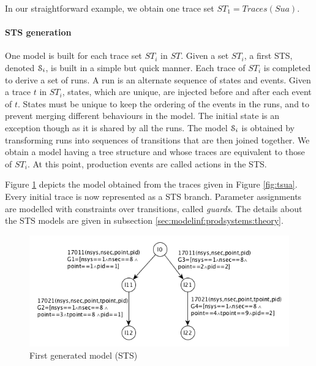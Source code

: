 In our straightforward example, we obtain one trace set
$ST_1=Traces(Sua)$.

\paragraph{STS generation}

One model is built for each trace set $ST_i$ in $ST$. Given a set
$ST_i$, a first STS, denoted $\EuScript{S}_i$, is built in a
simple but quick manner. Each trace of $ST_i$ is completed to
derive a set of runs. A run is an alternate sequence of states
and events. Given a trace $t$ in $ST_i$, states, which are
unique, are injected before and after each event of $t$. States
must be unique to keep the ordering of the events in the runs,
and to prevent merging different behaviours in the model.
The initial state is an exception though as it is shared by all
the runs. The model $\EuScript{S}_i$ is obtained by transforming
runs into sequences of transitions that are then joined together.
We obtain a model having a tree structure and whose traces are
equivalent to those of $ST_i$. At this point, production events
are called actions in the STS.

Figure \ref{fig:firstmodel} depicts the model obtained from the
traces given in Figure \ref{fig:tsua}. Every initial trace is now
represented as a STS branch. Parameter assignments are modelled
with constraints over transitions, called \textit{guards}. The
details about the STS models are given in subsection
\ref{sec:modelinf:prodsystems:theory}.\\

\begin{figure}[H]
	\begin{center}
        \includegraphics[width=1.0\linewidth]{figures/STS1.png}
	\end{center}

	\caption{First generated model (STS)}
	\label{fig:firstmodel}
\end{figure}


